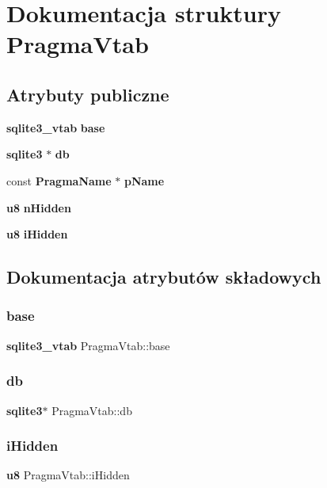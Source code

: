 \section{Dokumentacja struktury Pragma\+Vtab}
\label{struct_pragma_vtab}
\subsection*{Atrybuty publiczne}
\begin{DoxyCompactItemize}
\item 
\textbf{ sqlite3\+\_\+vtab} \textbf{ base}
\item 
\textbf{ sqlite3} $\ast$ \textbf{ db}
\item 
const \textbf{ Pragma\+Name} $\ast$ \textbf{ p\+Name}
\item 
\textbf{ u8} \textbf{ n\+Hidden}
\item 
\textbf{ u8} \textbf{ i\+Hidden}
\end{DoxyCompactItemize}


\subsection{Dokumentacja atrybutów składowych}
\mbox{\label{struct_pragma_vtab_acc936896f2d2a169fcb19cdc2fe48086}} 
\subsubsection{base}
{\footnotesize\ttfamily \textbf{ sqlite3\+\_\+vtab} Pragma\+Vtab\+::base}

\mbox{\label{struct_pragma_vtab_a954cec425127249deb5466af79e100a0}} 
\subsubsection{db}
{\footnotesize\ttfamily \textbf{ sqlite3}$\ast$ Pragma\+Vtab\+::db}

\mbox{\label{struct_pragma_vtab_a88ed1130d9fce82bf60132abec659856}} 
\subsubsection{iHidden}
{\footnotesize\ttfamily \textbf{ u8} Pragma\+Vtab\+::i\+Hidden}

